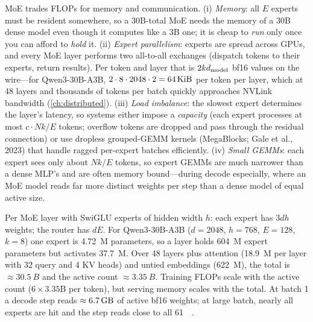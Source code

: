 \begin{systemslens}
MoE trades FLOPs for memory and communication. (i) \emph{Memory}: all $E$ experts must be resident
somewhere, so a 30B-total MoE needs the memory of a 30B dense model even though it computes like a 3B
one; it is cheap to \emph{run} only once you can afford to \emph{hold} it. (ii) \emph{Expert parallelism}:
experts are spread across GPUs, and every MoE layer performs two all-to-all exchanges (dispatch tokens to
their experts, return results). Per token and layer that is $2kd_{\text{model}}$ bf16 values on the wire---for
Qwen3-30B-A3B, $2\cdot8\cdot2048\cdot2=\SI{64}{\kibi\byte}$ per token per layer, which at 48 layers and
thousands of tokens per batch quickly approaches NVLink bandwidth (\cref{ch:distributed}). (iii)
\emph{Load imbalance}: the slowest expert determines the layer's latency, so systems either impose a
\emph{capacity} (each expert processes at most $c\cdot Nk/E$ tokens; overflow tokens are dropped and pass
through the residual connection) or use dropless grouped-GEMM kernels (MegaBlocks; Gale et al., 2023) that
handle ragged per-expert batches efficiently. (iv) \emph{Small GEMMs}: each expert sees only about $Nk/E$
tokens, so expert GEMMs are much narrower than a dense MLP's and are often memory bound---during decode
especially, where an MoE model reads far more distinct weights per step than a dense model of equal
active size.
\end{systemslens}

\begin{napkinmath}
Per MoE layer with SwiGLU experts of hidden width $h$: each expert has $3dh$ weights; the router has
$dE$. For Qwen3-30B-A3B ($d=2048$, $h=768$, $E=128$, $k=8$) one expert is \SI{4.72}{M} parameters,
so a layer holds \SI{604}{M} expert parameters but activates \SI{37.7}{M}. Over 48 layers plus attention
(\SI{18.9}{M} per layer with 32 query and 4 KV heads) and untied embeddings (\SI{622}{M}), the total is
$\approx\SI{30.5}{B}$ and the active count $\approx\SI{3.35}{B}$. Training FLOPs scale with the active
count ($6\times3.35$B per token), but serving memory scales with the total. At batch 1 a decode step
reads $\approx\SI{6.7}{\giga\byte}$ of active bf16 weights; at large batch, nearly all experts are hit and
the step reads close to all \SI{61}{\giga\byte}.
\end{napkinmath}


